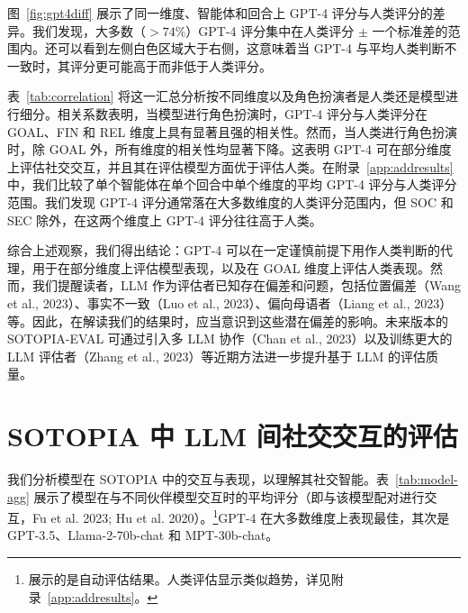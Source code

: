 \documentclass[11pt,a4paper]{article}
\begin{document}
图~\ref{fig:gpt4diff} 展示了同一维度、智能体和回合上 GPT-4 评分与人类评分的差异。我们发现，大多数（$> 74\%$）GPT-4 评分集中在人类评分 $\pm$ 一个标准差的范围内。还可以看到左侧白色区域大于右侧，这意味着当 GPT-4 与平均人类判断不一致时，其评分更可能高于而非低于人类评分。

表~\ref{tab:correlation} 将这一汇总分析按不同维度以及角色扮演者是人类还是模型进行细分。相关系数表明，当模型进行角色扮演时，GPT-4 评分与人类评分在 GOAL、FIN 和 REL 维度上具有显著且强的相关性。然而，当人类进行角色扮演时，除 GOAL 外，所有维度的相关性均显著下降。这表明 GPT-4 可在部分维度上评估社交交互，并且其在评估模型方面优于评估人类。在附录~\ref{app:addresults} 中，我们比较了单个智能体在单个回合中单个维度的平均 GPT-4 评分与人类评分范围。我们发现 GPT-4 评分通常落在大多数维度的人类评分范围内，但 SOC 和 SEC 除外，在这两个维度上 GPT-4 评分往往高于人类。

综合上述观察，我们得出结论：GPT-4 可以在一定谨慎前提下用作人类判断的代理，用于在部分维度上评估模型表现，以及在 GOAL 维度上评估人类表现。然而，我们提醒读者，LLM 作为评估者已知存在偏差和问题，包括位置偏差（Wang et al., 2023）、事实不一致（Luo et al., 2023）、偏向母语者（Liang et al., 2023）等。因此，在解读我们的结果时，应当意识到这些潜在偏差的影响。未来版本的 SOTOPIA-EVAL 可通过引入多 LLM 协作（Chan et al., 2023）以及训练更大的 LLM 评估者（Zhang et al., 2023）等近期方法进一步提升基于 LLM 的评估质量。

\section{SOTOPIA 中 LLM 间社交交互的评估}
\label{sec:llm}

我们分析模型在 SOTOPIA 中的交互与表现，以理解其社交智能。表~\ref{tab:model-agg} 展示了模型在与不同伙伴模型交互时的平均评分（即与该模型配对进行交互，Fu et al. 2023; Hu et al. 2020）。\footnote{展示的是自动评估结果。人类评估显示类似趋势，详见附录~\ref{app:addresults}。}GPT-4 在大多数维度上表现最佳，其次是 GPT-3.5、Llama-2-70b-chat 和 MPT-30b-chat。
\end{document}
